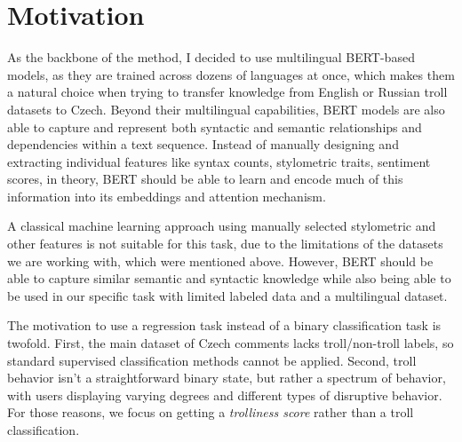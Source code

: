 \documentclass[twoside]{ctuthesis}
\theoremstyle{plain}
\theoremstyle{definition}
\theoremstyle{note}
\begin{document}
\section{Motivation}
As the backbone of the method, I decided to use multilingual BERT-based models, as they are trained across dozens of languages at once, which makes them a natural choice when trying to transfer knowledge from English or Russian troll datasets to Czech. Beyond their multilingual capabilities, BERT models are also able to capture and represent both syntactic and semantic relationships and dependencies within a text sequence. Instead of manually designing and extracting individual features like syntax counts, stylometric traits, sentiment scores, in theory, BERT should be able to learn and encode much of this information into its embeddings and attention mechanism\cite{Rogers2020}.\par
A classical machine learning approach using manually selected stylometric and other features is not suitable for this task, due to the limitations of the datasets we are working with, which were mentioned above. However, BERT should be able to capture similar semantic and syntactic knowledge while also being able to be used in our specific task with limited labeled data and a multilingual dataset.\par
The motivation to use a regression task instead of a binary classification task is twofold. First, the main dataset of Czech comments lacks troll/non-troll labels, so standard supervised classification methods cannot be applied. Second, troll behavior isn't a straightforward binary state, but rather a spectrum of behavior, with users displaying varying degrees and different types of disruptive behavior. For those reasons, we focus on getting a \textit{trolliness score} rather than a troll classification.\par
\end{document}
